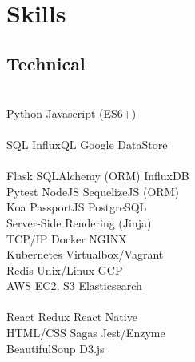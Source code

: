 \documentclass[]{deedy-resume-openfont}
\begin{document}
\begin{minipage}[t]{0.31\textwidth}
\\[1\baselineskip]


\section{Skills}
\subsection{Technical}
\\[1\baselineskip]

Python \textbullet{} Javascript (ES6+) \\
\\[1\baselineskip]

SQL \textbullet{} InfluxQL \textbullet{} Google DataStore \\
\\[1\baselineskip]

Flask \textbullet{} SQLAlchemy (ORM) \textbullet{} InfluxDB \\
Pytest \textbullet{} NodeJS \textbullet{} SequelizeJS (ORM)   \\
Koa \textbullet{} PassportJS \textbullet{} PostgreSQL\\
Server-Side Rendering (Jinja)
\\[1\baselineskip]

TCP/IP \textbullet{} Docker \textbullet{} NGINX \\
Kubernetes \textbullet{} Virtualbox/Vagrant \\
Redis \textbullet{} Unix/Linux \textbullet{} GCP \\
AWS EC2, S3 \textbullet{} Elasticsearch \\
\\[1\baselineskip]

React \textbullet{} Redux \textbullet{} React Native \\
 HTML/CSS \textbullet{} Sagas \textbullet{} Jest/Enzyme \\
 BeautifulSoup \textbullet{} D3.js \\
\\[1\baselineskip]



\end{minipage}
\end{document}
